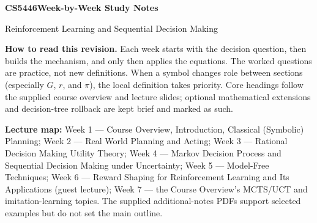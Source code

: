 \documentclass[10pt,a4paper]{article}
\begin{document}
{\LARGE\bfseries\color{accent}CS5446\quad Week-by-Week Study Notes}\par
{\large Reinforcement Learning and Sequential Decision Making}\par

\begin{plain}
\textbf{How to read this revision.} Each week starts with the decision question, then builds the mechanism, and only then applies the equations. The worked questions are practice, not new definitions. When a symbol changes role between sections (especially $G$, $r$, and $\pi$), the local definition takes priority. Core headings follow the supplied course overview and lecture slides; optional mathematical extensions and decision-tree rollback are kept brief and marked as such.

\textbf{Lecture map:} Week 1 --- Course Overview, Introduction, Classical (Symbolic) Planning; Week 2 --- Real World Planning and Acting; Week 3 --- Rational Decision Making Utility Theory; Week 4 --- Markov Decision Process and Sequential Decision Making under Uncertainty; Week 5 --- Model-Free Techniques; Week 6 --- Reward Shaping for Reinforcement Learning and Its Applications (guest lecture); Week 7 --- the Course Overview's MCTS/UCT and imitation-learning topics. The supplied additional-notes PDFs support selected examples but do not set the main outline.
\end{plain}

\tableofcontents
\end{document}
